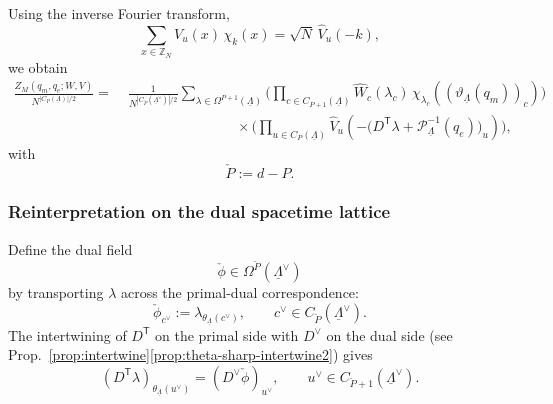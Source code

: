 Using the inverse Fourier transform,
\begin{equation}
	\sum_{x\in \mathbb Z_N}V_u(x)\,\chi_k(x)
	=
	\sqrt N\,\widehat V_u(-k),
\end{equation}
we obtain
\begin{equation}
	\begin{aligned}
		\frac{Z_M(q_m,q_e;W,V)}{N^{|C_P(\underline\Lambda)|/2}}
		=&\;
		\frac{1}{N^{|C_{\check P}(\underline\Lambda^\vee)|/2}}
		\sum_{\lambda\in \Omega^{P+1}(\underline\Lambda)}
		\Biggl(
		\prod_{c\in C_{P+1}(\underline\Lambda)}
		\widehat W_c(\lambda_c)\,
		\chi_{\lambda_c} \left((\vartheta_{\underline\Lambda}(q_m))_c\right)
		\Biggr)
		\\
		& \hspace{8em} \times
		\Biggl(
		\prod_{u\in C_P(\underline\Lambda)}
		\widehat V_u \left(-\bigl(D^{\mathsf T}\lambda+\mathcal P_{\underline\Lambda}^{-1}(q_e)\bigr)_u\right)
		\Biggr),
	\end{aligned}
	\label{eq:KW-fixed-charge-primal-fourier}
\end{equation}
with
\begin{equation}
	\check P:=d-P. \label{eq:dualP}
\end{equation}

\subsubsection{Reinterpretation on the dual spacetime lattice}

Define the dual field
\begin{equation}
	\check\phi\in \Omega^{\check P}(\underline\Lambda^\vee)
\end{equation}
by transporting \(\lambda\) across the primal-dual correspondence:
\begin{equation}
	\check\phi_{c^\vee}
	:=
	\lambda_{\theta_{\underline\Lambda}(c^\vee)},
	\qquad
	c^\vee\in C_{\check P}(\underline\Lambda^\vee).
	\label{eq:KW-dual-field}
\end{equation}
The intertwining of \(D^{\mathsf T}\) on the primal side with \(D^\vee\) on the dual side
(see Prop.~\ref{prop:intertwine}\ref{prop:theta-sharp-intertwine2}) gives
\begin{equation}
	(D^{\mathsf T}\lambda)_{\theta_{\underline\Lambda}(u^\vee)}
	=
	(D^\vee \check\phi)_{u^\vee},
	\qquad
	u^\vee\in C_{\check P+1}(\underline\Lambda^\vee).
	\label{eq:KW-Dt-dual}
\end{equation}


